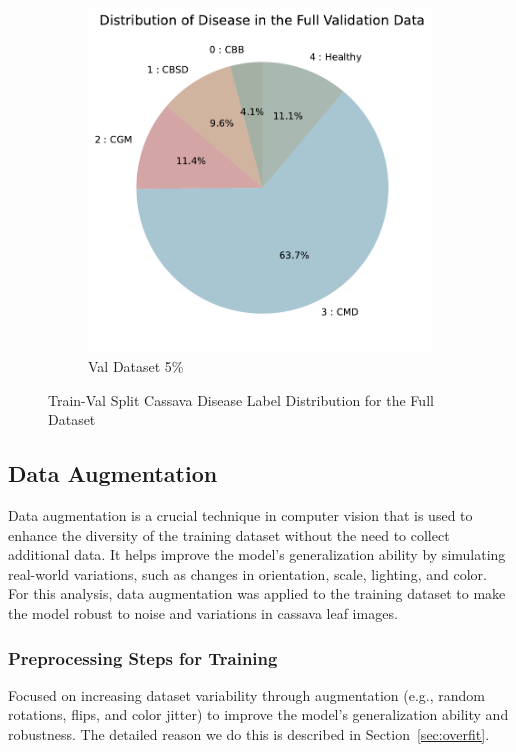 \begin{figure}[t]
\begin{subfigure}{0.4\textwidth}
        \includegraphics[width=\linewidth]{graphs/overview/Distribution of Disease in the Full Validation Data.pdf}
        \caption{Val Dataset 5\%}
        \label{fig:ImbalancedVal}
    \end{subfigure}
    \caption{Train-Val Split Cassava Disease Label Distribution for the Full Dataset}
    \label{fig:TrainValSplit}
\end{figure}



\subsection{Data Augmentation}

Data augmentation is a crucial technique in computer vision that is used to enhance the diversity of the training dataset without the need to collect additional data. It helps improve the model's generalization ability by simulating real-world variations, such as changes in orientation, scale, lighting, and color. For this analysis, data augmentation was applied to the training dataset to make the model robust to noise and variations in cassava leaf images.

\subsubsection{Preprocessing Steps for Training}\label{sec:pre_image}
Focused on increasing dataset variability through augmentation (e.g., random rotations, flips, and color jitter) to improve the model's generalization ability and robustness. The detailed reason we do this is described in Section~\ref{sec:overfit}.

